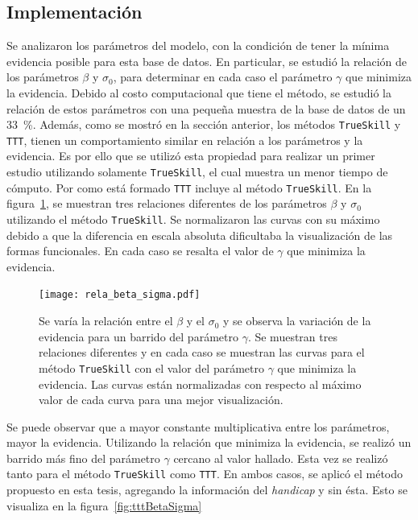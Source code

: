 \documentclass[11pt,twoside,spanish]{report} %
\begin{document}
\subsection{Implementaci\'on}

Se analizaron los par\'ametros del modelo, con la condici\'on de tener la m\'inima evidencia posible para esta base de datos.
En particular, se estudi\'o la relaci\'on de los par\'ametros $\beta$ y $\sigma_0$, para determinar en cada caso el par\'ametro $\gamma$ que minimiza la evidencia.
Debido al costo computacional que tiene el m\'etodo, se estudi\'o la relaci\'on de estos par\'ametros con una peque\~na muestra de la base de datos de un \SI{33}{\percent}.
Adem\'as, como se mostr\'o en la secci\'on anterior, los m\'etodos \texttt{TrueSkill} y \texttt{TTT}, tienen un comportamiento similar en relaci\'on a los par\'ametros y la evidencia.
Es por ello que se utiliz\'o esta propiedad para realizar un primer estudio utilizando solamente \texttt{TrueSkill}, el cual muestra un menor tiempo de c\'omputo.
Por como est\'a formado \texttt{TTT} incluye al m\'etodo \texttt{TrueSkill}.
En la figura~\ref{fig:relaBetaSigma}, se muestran tres relaciones diferentes de los par\'ametros $\beta$ y $\sigma_0$ utilizando el m\'etodo \texttt{TrueSkill}.
Se normalizaron las curvas con su m\'aximo debido a que la diferencia en escala absoluta dificultaba la visualizaci\'on de las formas funcionales.
En cada caso se resalta el valor de $\gamma$ que minimiza la evidencia.




\begin{figure}[H]
	\centering
	\texttt{[image: rela\_beta\_sigma.pdf]}
	\caption{Se var\'ia la relaci\'on entre el $\beta$ y el $\sigma_0$ y se observa la variaci\'on de la evidencia para un barrido del par\'ametro $\gamma$. Se muestran tres relaciones diferentes y en cada caso se muestran las curvas para el m\'etodo \texttt{TrueSkill} con el valor del par\'ametro $\gamma$ que  minimiza la evidencia. Las curvas est\'an normalizadas con respecto al m\'aximo valor de cada curva para una mejor visualizaci\'on.}
	\label{fig:relaBetaSigma}
\end{figure}


Se puede observar que a mayor constante multiplicativa entre los par\'ametros, mayor la evidencia.
Utilizando la relaci\'on que minimiza la evidencia, se realiz\'o un barrido m\'as fino del par\'ametro $\gamma$  cercano al valor hallado.
Esta vez se realiz\'o tanto para el m\'etodo \texttt{TrueSkill} como \texttt{TTT}.
En ambos casos, se aplic\'o el m\'etodo propuesto en esta tesis, agregando la informaci\'on del \textit{handicap} y sin \'esta.
Esto se visualiza en la figura~\ref{fig:tttBetaSigma}
\end{document}
